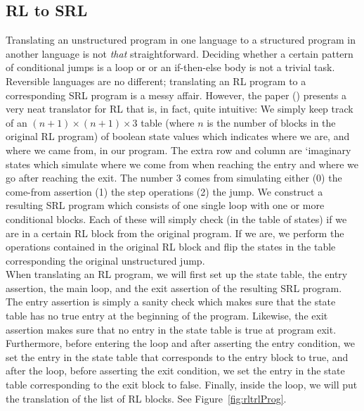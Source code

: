 
\subsection{RL to SRL}

Translating an unstructured program in one language to a structured program in another language is not \textit{that} straightforward. Deciding whether a certain pattern of conditional jumps is a loop or or an if-then-else body is not a trivial task. Reversible languages are no different; translating an RL program to a corresponding SRL program is a messy affair. However, the paper (\cite[p.~107]{REV}) presents a very neat translator for RL that is, in fact, quite intuitive: We simply keep track of an $(n+1) \times (n+1) \times 3$ table (where $n$ is the number of blocks in the original RL program) of boolean state values which indicates where we are, and where we came from, in our program. The extra row and column are `imaginary states which simulate where we come from when reaching the entry and where we go after reaching the exit. The number $3$ comes from simulating either (0) the come-from assertion (1) the step operations (2) the jump. We construct a resulting SRL program which consists of one single loop with one or more conditional blocks. Each of these will simply check (in the table of states) if we are in a certain RL block from the original program. If we are, we perform the operations contained in the original RL block and flip the states in the table corresponding the original unstructured jump.\\

\noindent When translating an RL program, we will first set up the state table, the entry assertion, the main loop, and the exit assertion of the resulting SRL program. The entry assertion is simply a sanity check which makes sure that the state table has no true entry at the beginning of the program. Likewise, the exit assertion makes sure that no entry in the state table is true at program exit. Furthermore, before entering the loop and after asserting the entry condition, we set the entry in the state table that corresponds to the entry block to true, and after the loop, before asserting the exit condition, we set the entry in the state table corresponding to the exit block to false. Finally, inside the loop, we will put the translation of the list of RL blocks. See Figure~\ref{fig:rltrlProg}.\\

